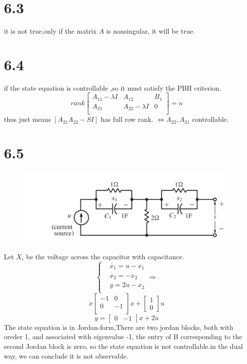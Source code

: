 \documentclass{article}
\begin{document}
\section*{6.3}
it is not true,only if the matrix $A$ is nonsingular, it will be true.

\section*{6.4}
if the state equation is controllable ,so it must satisfy the PBH criterion.
\[
rank
\left[
    \begin{array}{ccc}
    A_{11}-\lambda I &A_{12} &B_1\\
    A_{21} & A_{22}-\lambda I & 0\\
    \end{array}
\right]=n   
\]
thus just means $[A_{21} A_{22}-SI]$ has full row rank.
$\iff {A_{22},A_{21}}$ controllable.

\section*{6.5}
\begin{figure}[hp]
    \centering
        \includegraphics{png6.1.PNG}
        \end{figure}
Let $X_i$ be the voltage across the capacitor with capacitance.
\[
\left\{
\begin{aligned}
    &\dot{x_1}=u-x_1\\
    &\dot{x_2}=-x_2\\
    &y=2u-x_2\\
\end{aligned}    
\right.
\Rightarrow 
\]
\[
    \dot{x}
    \left[
        \begin{array}{cc}
            -1 & 0\\
            0 & -1\\
        \end{array}
    \right]x+
    \left[
        \begin{array}{c}
        1\\
        0
        \end{array}
    \right]u
\]
\[
    y=\left[
        \begin{array}{cc}
            0 & -1
        \end{array}
    \right]x+2u    
\]
The state equation is in Jordan-form,There are two jordan blocks, both with oreder 1, and 
associated  with eigenvalue -1, the entry of B corresponding to the second Jordan block is zero, 
so the state equation is not controllable.in the dual way, we can conclude it is not observable.
\end{document}
